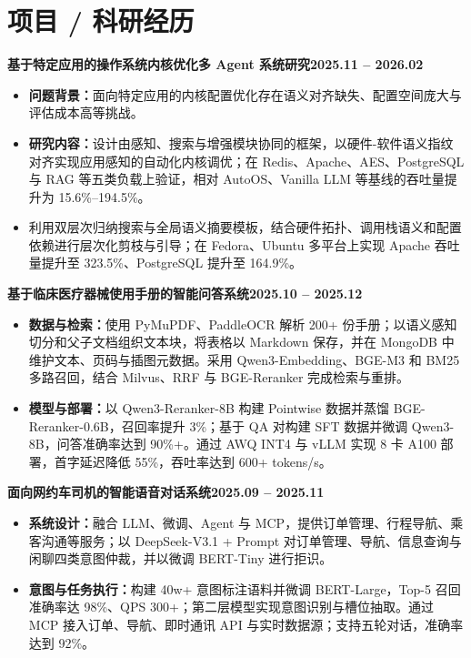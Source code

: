 \documentclass[10pt,a4paper]{article}
\newcommand{\projecttitle}[2]{%
  \vspace{2pt}\textbf{#1}\hfill\textbf{#2}\par\vspace{1pt}
}
\newcommand{\labeltext}[1]{\textbf{#1}}
\begin{document}
\section{项目 / 科研经历}
\projecttitle{基于特定应用的操作系统内核优化多 Agent 系统研究}{2025.11 -- 2026.02}
\begin{itemize}
  \item \labeltext{问题背景：}面向特定应用的内核配置优化存在语义对齐缺失、配置空间庞大与评估成本高等挑战。
  \item \labeltext{研究内容：}设计由感知、搜索与增强模块协同的框架，以硬件-软件语义指纹对齐实现应用感知的自动化内核调优；在 Redis、Apache、AES、PostgreSQL 与 RAG 等五类负载上验证，相对 AutoOS、Vanilla LLM 等基线的吞吐量提升为 15.6\%--194.5\%。
  \item 利用双层次归纳搜索与全局语义摘要模板，结合硬件拓扑、调用栈语义和配置依赖进行层次化剪枝与引导；在 Fedora、Ubuntu 多平台上实现 Apache 吞吐量提升至 323.5\%、PostgreSQL 提升至 164.9\%。
\end{itemize}

\projecttitle{基于临床医疗器械使用手册的智能问答系统}{2025.10 -- 2025.12}
\begin{itemize}
  \item \labeltext{数据与检索：}使用 PyMuPDF、PaddleOCR 解析 200+ 份手册；以语义感知切分和父子文档组织文本块，将表格以 Markdown 保存，并在 MongoDB 中维护文本、页码与插图元数据。采用 Qwen3-Embedding、BGE-M3 和 BM25 多路召回，结合 Milvus、RRF 与 BGE-Reranker 完成检索与重排。
  \item \labeltext{模型与部署：}以 Qwen3-Reranker-8B 构建 Pointwise 数据并蒸馏 BGE-Reranker-0.6B，召回率提升 3\%；基于 QA 对构建 SFT 数据并微调 Qwen3-8B，问答准确率达到 90\%+。通过 AWQ INT4 与 vLLM 实现 8 卡 A100 部署，首字延迟降低 55\%，吞吐率达到 600+ tokens/s。
\end{itemize}

\newpage
\projecttitle{面向网约车司机的智能语音对话系统}{2025.09 -- 2025.11}
\begin{itemize}
  \item \labeltext{系统设计：}融合 LLM、微调、Agent 与 MCP，提供订单管理、行程导航、乘客沟通等服务；以 DeepSeek-V3.1 + Prompt 对订单管理、导航、信息查询与闲聊四类意图仲裁，并以微调 BERT-Tiny 进行拒识。
  \item \labeltext{意图与任务执行：}构建 40w+ 意图标注语料并微调 BERT-Large，Top-5 召回准确率达 98\%、QPS 300+；第二层模型实现意图识别与槽位抽取。通过 MCP 接入订单、导航、即时通讯 API 与实时数据源；支持五轮对话，准确率达到 92\%。
\end{itemize}
\end{document}
